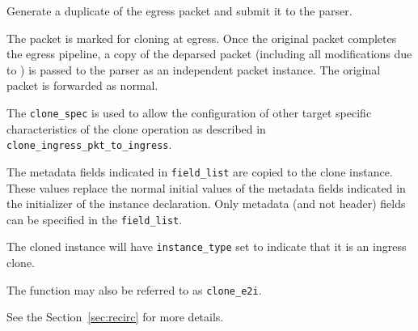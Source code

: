 \documentclass[12pt]{article}
\begin{document}
{ %
Generate a duplicate of the egress packet and submit it to the parser.
}
{ %
}
{ %
The packet is marked for cloning at egress. Once the original packet completes 
the egress pipeline, a copy of the deparsed packet (including all modifications 
due to \matchaction) is passed to the parser as an independent packet instance. 
The original packet is forwarded as normal.

The \texttt{clone_spec} is used to allow the configuration of other target specific 
characteristics of the clone operation as described in \texttt{clone_ingress_pkt_to_ingress}. 


The metadata fields indicated in \texttt{field_list} are copied to the clone instance. These 
values replace the normal initial values of the metadata fields indicated 
in the initializer of the instance declaration.  {\color{red} Only metadata (and not header) fields can be specified in the \texttt{field_list}.}

The cloned instance will have \texttt{instance_type} set to indicate that it is an 
ingress clone. 

The function may also be referred to as \texttt{clone_e2i}.

See the Section~\ref{sec:recirc} for more details.

}

\end{document}
